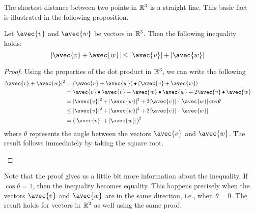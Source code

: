 \documentclass[handout]{ximera}
\begin{document}
The shortest distance between two points in $\mathbb R^3$ is a straight line.  This basic fact is illustrated in the following proposition.

\begin{proposition}
Let $\avec{v}$ and $\avec{w}$ be vectors in $\mathbb R^3$. Then the following inequality holds:
\[
|\avec{v} + \avec{w}| \leq |\avec{v}| +|\avec{w}| 
\]



\begin{proof}
Using the properties of the dot product in $\mathbb R^3$, we can write the following
\begin{align*}
|\avec{v} + \avec{w}|^2 &= \left(\avec{v} + \avec{w}\right) \dotp \left(\avec{v} + \avec{w}\right)\\
                        &= \avec{v} \dotp \avec{v} + \avec{w}\dotp \avec{w} + 2\avec{v} \dotp \avec{w}\\
                        &= |\avec{v}|^2 +|\avec{w}|^2 + 2|\avec{v}|\cdot |\avec{w}| \cos \theta\\
                        &\leq |\avec{v}|^2 +|\avec{w}|^2 + 2|\avec{v}|\cdot |\avec{w}|\\
                        &= \left(|\avec{v}| + |\avec{w}|\right)^2
\end{align*}
where $\theta$ represents the angle between the vectors $\avec{v}$ and $\avec{w}$.  The result follows immediately by taking the square root.
          
\begin{image}
\end{image}

              
\end{proof}

\end{proposition}

Note that the proof gives us a little bit more information about the inequality. If $\cos \theta = 1$, then the inequality becomes equality.  This happens precisely 
when the vectors $\avec{v}$ and $\avec{w}$ are in the same direction, i.e., when $\theta = 0$. The result holds for vectors in $\mathbb R^2$ as well using the same proof.
\end{document}
